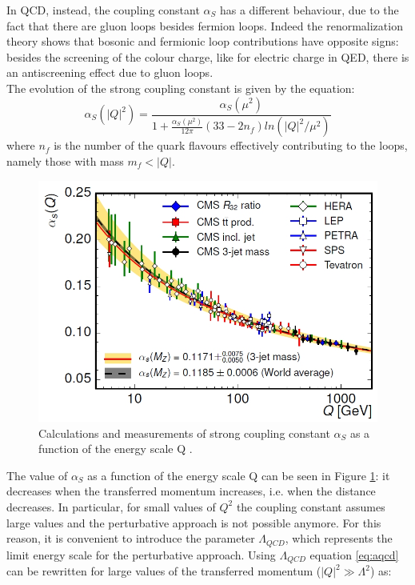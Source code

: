 %
In QCD, instead, the coupling constant $\alpha_{S}$ has a different behaviour, due to the fact that there are gluon loops besides fermion loops. Indeed the renormalization theory shows that bosonic and fermionic loop contributions have opposite signs: besides the screening of the colour charge, like for electric charge in QED, there is an antiscreening effect due to gluon loops.\\
The evolution of the strong coupling constant is given by the equation:
%
\begin{equation}
 \alpha_{S}(|Q|^{2})= \frac{ \alpha_{S}(\mu^{2})}{1+\frac{\alpha_{S}(\mu^{2})}{12\pi}(33-2n_{f})ln(|Q|^{2} / \mu^{2})}
 \label{eq:aqcd}
\end{equation}
%
where $n_{f}$ is the number of the quark flavours effectively contributing to the loops, namely those with mass $m_{f} < |Q|$.
%
\begin{figure}
  \centering
  \includegraphics[scale=0.30]{figures/alphas_3j.jpg}
  \caption{Calculations and measurements of strong coupling constant $\alpha_{S}$ as a function of the energy scale Q \cite{kh2015}.}
  \label{fig:alphas}
\end{figure}
%
The value of $\alpha_{S}$ as a function of the energy scale Q can be seen in Figure \ref{fig:alphas}: it decreases when the transferred momentum increases, i.e. when the distance decreases. In particular, for small values of $Q^{2}$ the coupling constant assumes large values and the perturbative approach is not possible anymore.
For this reason, it is convenient to introduce the parameter $\Lambda_{QCD}$, which represents the limit energy scale for the perturbative approach. Using $\Lambda_{QCD}$ equation \ref{eq:aqcd} can be rewritten for large values of the transferred momentum ($|Q|^{2} \gg \Lambda^{2}$) as:
